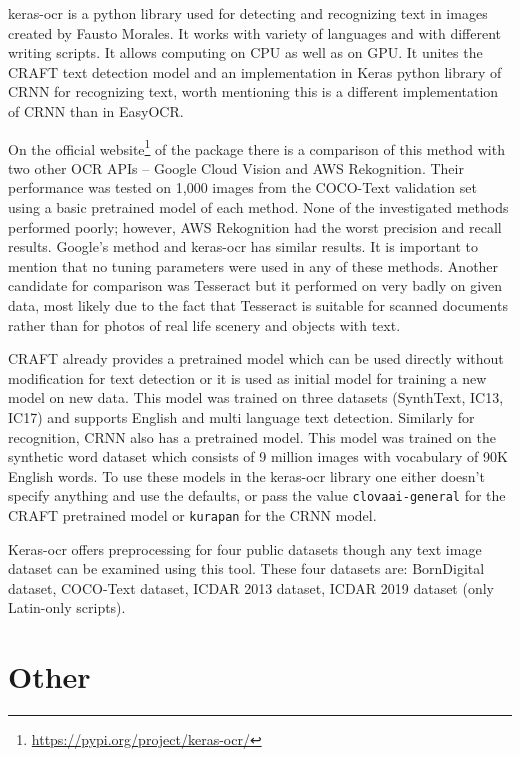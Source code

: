 keras-ocr is a python library used for detecting and recognizing text in images created by Fausto Morales. It works with variety of languages and with different writing scripts. It allows computing on CPU as well as on GPU.  It unites the CRAFT text detection model and an implementation in Keras python library of CRNN for recognizing text, worth mentioning this is a different implementation of CRNN than in EasyOCR.\cite{keras-ocr1}

On the official website\footnote{\url{https://pypi.org/project/keras-ocr/}} of the package there is a comparison of this method with two other OCR APIs -- Google Cloud Vision and AWS Rekognition. Their performance was tested on 1,000 images from the COCO-Text validation set using a basic pretrained model of each method. None of the investigated methods performed poorly; however, AWS Rekognition had the worst precision and recall results. Google's method and keras-ocr has similar results. It is important to mention that no tuning parameters were used in any of these methods. Another candidate for comparison was Tesseract but it performed on very badly on given data, most likely due to the fact that Tesseract is suitable for scanned documents rather than for photos of real life scenery and objects with text. \cite{keras-ocr1}

CRAFT already provides a pretrained model which can be used directly without modification for text detection or it is used as initial model for training a new model on new data. This model was trained on three datasets (SynthText, IC13, IC17) and supports English and multi language text detection.\cite{craft1}
Similarly for recognition, CRNN also has a pretrained model. This model was trained on the synthetic word dataset which consists of 9 million images with vocabulary of 90K English words.\cite{synth}
To use these models in the keras-ocr library one either doesn't specify anything and use the defaults, or pass the value \texttt{clovaai-general} for the CRAFT pretrained model or \texttt{kurapan} for the CRNN model.

Keras-ocr offers preprocessing for four public datasets though any text image dataset can be examined using this tool. These four datasets are: BornDigital dataset, COCO-Text dataset, ICDAR 2013 dataset, ICDAR 2019 dataset (only Latin-only scripts).\cite{keras-ocrDocu}


\section{Other}

